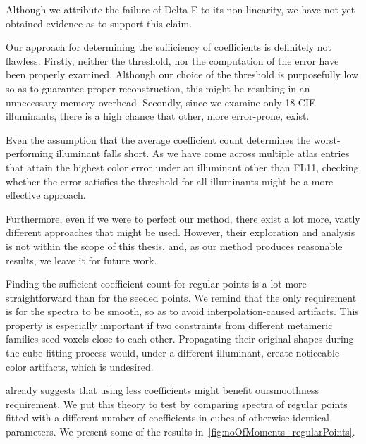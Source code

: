 Although we attribute the failure of Delta E to its non-linearity, we have not yet obtained evidence as to support this claim.

Our approach for determining the sufficiency of coefficients is definitely not flawless. Firstly, neither the threshold, nor the computation of the error have been properly examined. Although our choice of the threshold is purposefully low so as to guarantee proper reconstruction, this might be resulting in an unnecessary memory overhead. Secondly, since we examine only 18 CIE illuminants, there is a high chance that other, more error-prone, exist.

Even the assumption that the average coefficient count determines the worst-performing illuminant falls short. As we have come across multiple atlas entries that attain the highest color error under an illuminant other than FL11, checking whether the error satisfies the threshold for all illuminants might be a more effective approach.

Furthermore, even if we were to perfect our method, there exist a lot more, vastly different approaches that might be used. However, their exploration and analysis is not within the scope of this thesis, and, as our method produces reasonable results, we leave it for future work.

Finding the sufficient coefficient count for regular points is a lot more straightforward than for the seeded points. We remind that the only requirement is for the spectra to be smooth, so as to avoid interpolation-caused artifacts. This property is especially important if two constraints from different metameric families seed voxels close to each other. Propagating their original shapes during the cube fitting process would, under a different illuminant, create noticeable color artifacts, which is undesired.

 already suggests that using less coefficients might benefit our\newline smoothness requirement. We put this theory to test by comparing spectra of regular points fitted with a different number of coefficients in cubes of otherwise identical parameters. We present some of the results in~\cref{fig:noOfMoments_regularPoints}.

